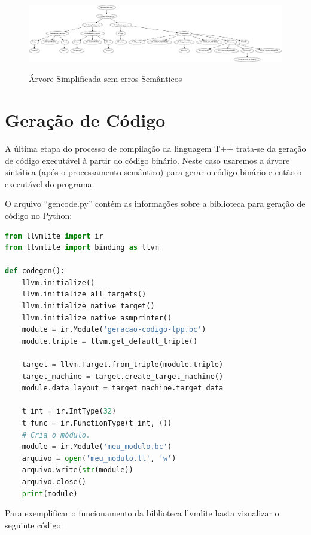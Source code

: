 \documentclass[12pt]{article}
\begin{document}
\begin{figure}[H]  
	\centering  
	\caption{Árvore Simplificada sem erros Semânticos}
	\includegraphics[width=\textwidth]{arvore-sintatica2} 
	\label{fig:arvoresimplificada}
\end{figure}
%  

\section{Geração de Código} 
A última etapa do processo de compilação da linguagem T++ trata-se da geração de código executável à partir do código binário. Neste caso usaremos a árvore sintática (após o processamento semântico) para gerar o código binário e então o executável do programa. 

O arquivo ``gencode.py'' contém as informações sobre a biblioteca para geração de código no Python:   
\begin{lstlisting}[language= Python, caption= Bibliotecas para geração de código em Python, label=cod:coddp] 
from llvmlite import ir   
from llvmlite import binding as llvm    

def codegen():
	llvm.initialize()
	llvm.initialize_all_targets()
	llvm.initialize_native_target()
	llvm.initialize_native_asmprinter()  
	module = ir.Module('geracao-codigo-tpp.bc')  
	module.triple = llvm.get_default_triple()
	
	target = llvm.Target.from_triple(module.triple)
	target_machine = target.create_target_machine() 
	module.data_layout = target_machine.target_data   
	
	t_int = ir.IntType(32) 
	t_func = ir.FunctionType(t_int, ()) 
	# Cria o módulo.
	module = ir.Module('meu_modulo.bc')
	arquivo = open('meu_modulo.ll', 'w')
	arquivo.write(str(module))
	arquivo.close()
	print(module) 
\end{lstlisting}  

Para exemplificar o funcionamento da biblioteca llvmlite basta visualizar o seguinte código: 
\end{document}
